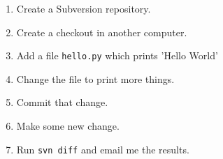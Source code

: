 \begin{enumerate}
\item Create a Subversion repository.
\item Create a checkout in another computer.
\item Add a file \texttt{hello.py} which prints 'Hello World'
\item Change the file to print more things.
\item Commit that change.
\item Make some new change.
\item Run \texttt{svn diff} and email me the results.
\end{enumerate}


